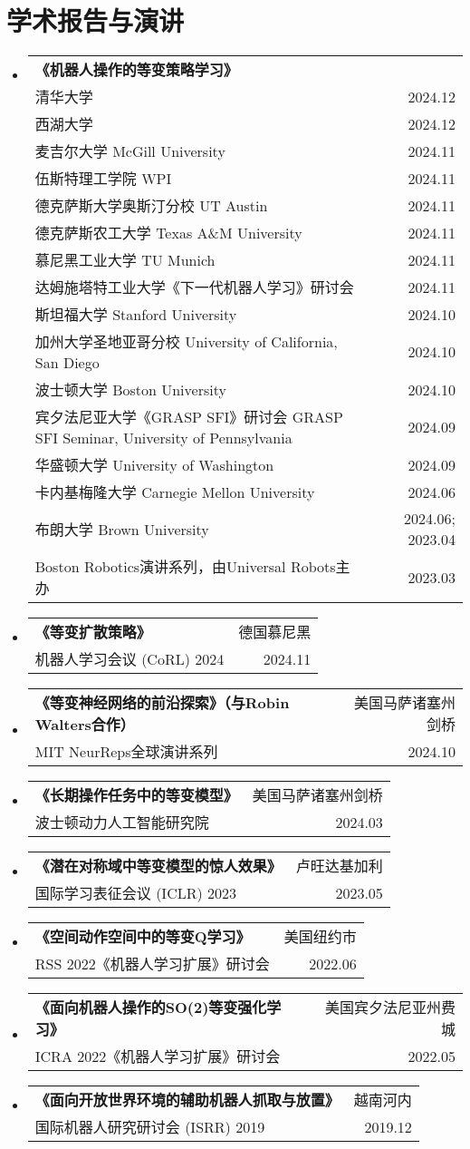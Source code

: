 \documentclass[letterpaper,12pt]{ctexart}
\makeatletter
\newcommand{\resumeSubheading}[4]{
  \vspace{-4pt}\item
    \begin{tabular*}{0.97\textwidth}[t]{l@{\extracolsep{\fill}}r}
      \textbf{\small#1} & \small#2 \\
      {\small#3} & {\small #4} \\
    \end{tabular*}\vspace{-7pt}
}
\newcommand{\resumeSubHeadingListStart}{\begin{itemize}[leftmargin=0.15in, label={}]}
\newcommand{\resumeSubHeadingListEnd}{\end{itemize}}
\makeatother
\begin{document}
\section{学术报告与演讲}
\resumeSubHeadingListStart
\vspace{-4pt}\item
\begin{tabular*}{0.97\textwidth}[t]{l@{\extracolsep{\fill}}r}
\textbf{\small 《机器人操作的等变策略学习》} & \small  \\
{\small 清华大学} & {\small 2024.12} \\
{\small 西湖大学} & {\small 2024.12} \\
{\small 麦吉尔大学 McGill University} & {\small 2024.11} \\
{\small 伍斯特理工学院 WPI} & {\small 2024.11} \\
{\small 德克萨斯大学奥斯汀分校 UT Austin} & {\small 2024.11} \\
{\small 德克萨斯农工大学 Texas A\&M University} & {\small 2024.11} \\
{\small 慕尼黑工业大学 TU Munich} & {\small 2024.11} \\
{\small 达姆施塔特工业大学《下一代机器人学习》研讨会} & {\small 2024.11} \\
{\small 斯坦福大学 Stanford University} & {\small 2024.10} \\
{\small 加州大学圣地亚哥分校 University of California, San Diego} & {\small 2024.10} \\
{\small 波士顿大学 Boston University} & {\small 2024.10} \\
{\small 宾夕法尼亚大学《GRASP SFI》研讨会 GRASP SFI Seminar, University of Pennsylvania} & {\small 2024.09} \\
{\small 华盛顿大学 University of Washington} & {\small 2024.09} \\
{\small 卡内基梅隆大学 Carnegie Mellon University} & {\small 2024.06} \\
{\small 布朗大学 Brown University} & {\small 2024.06; 2023.04} \\
{\small Boston Robotics演讲系列，由Universal Robots主办} & {\small 2023.03} \\
\end{tabular*}
\vspace{-3pt}

\resumeSubheading{《等变扩散策略》}{德国慕尼黑}
{机器人学习会议 (CoRL) 2024}{2024.11}
\resumeSubheading{《等变神经网络的前沿探索》（与Robin Walters合作）}{美国马萨诸塞州剑桥}
{MIT NeurReps全球演讲系列}{2024.10}
\resumeSubheading{《长期操作任务中的等变模型》}{美国马萨诸塞州剑桥}
{波士顿动力人工智能研究院}{2024.03}
\resumeSubheading{《潜在对称域中等变模型的惊人效果》}{卢旺达基加利}
{国际学习表征会议 (ICLR) 2023}{2023.05}
\resumeSubheading{《空间动作空间中的等变Q学习》}{美国纽约市}
{RSS 2022《机器人学习扩展》研讨会}{2022.06}
\resumeSubheading{《面向机器人操作的SO(2)等变强化学习》}{美国宾夕法尼亚州费城}
{ICRA 2022《机器人学习扩展》研讨会}{2022.05}
\resumeSubheading{《面向开放世界环境的辅助机器人抓取与放置》}{越南河内}
{国际机器人研究研讨会 (ISRR) 2019}{2019.12}
\vspace{1pt}
\resumeSubHeadingListEnd
\end{document}
